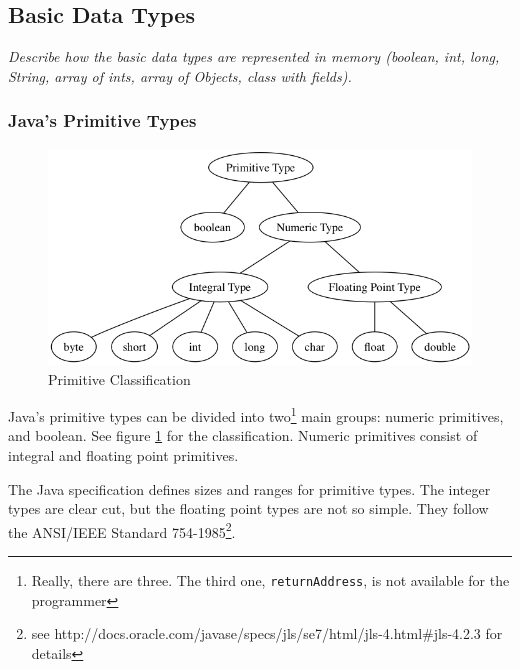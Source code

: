 \subsection{Basic Data Types}
\textit{Describe how the basic data types are represented in memory (boolean, int, long, String, array of ints, array of Objects, class with fields).}

\subsubsection{Java's Primitive Types} 
\begin{figure}[!h]\centering
\includegraphics[width=\linewidth, frame]{primitives.png}
\caption{Primitive Classification}
\label{fig:primitiveTypes}
\end{figure}
Java's primitive types can be divided into two\footnote{Really, there are three. The third one, \texttt{returnAddress}, is not available for the programmer} main groups: numeric primitives, and boolean. See figure \ref{fig:primitiveTypes} for the classification.  Numeric primitives consist of integral and floating point primitives.\cite{gosling}

The Java specification\cite{gosling} defines sizes and ranges for primitive types. The integer types are clear cut, but the floating point types are not so simple. They follow the ANSI/IEEE Standard 754-1985\footnote{see http://docs.oracle.com/javase/specs/jls/se7/html/jls-4.html\#jls-4.2.3 for details}. 

